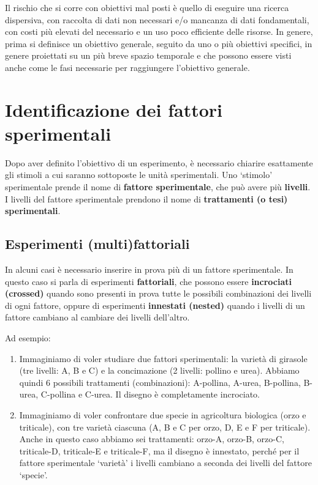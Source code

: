\documentclass[a4paper,12pt,oneside]{book}
\providecommand{\tightlist}{%
  \setlength{\itemsep}{0pt}\setlength{\parskip}{0pt}}
\begin{document}
Il rischio che si corre con obiettivi mal posti è quello di eseguire una ricerca dispersiva, con raccolta di dati non necessari e/o mancanza di dati fondamentali, con costi più elevati del necessario e un uso poco efficiente delle risorse. In genere, prima si definisce un obiettivo generale, seguito da uno o più obiettivi specifici, in genere proiettati su un più breve spazio temporale e che possono essere visti anche come le fasi necessarie per raggiungere l'obiettivo generale.

\hypertarget{identificazione-dei-fattori-sperimentali}{%
\section{Identificazione dei fattori sperimentali}\label{identificazione-dei-fattori-sperimentali}}

Dopo aver definito l'obiettivo di un esperimento, è necessario chiarire esattamente gli stimoli a cui saranno sottoposte le unità sperimentali. Uno `stimolo' sperimentale prende il nome di \textbf{fattore sperimentale}, che può avere più \textbf{livelli}. I livelli del fattore sperimentale prendono il nome di \textbf{trattamenti (o tesi) sperimentali}.

\hypertarget{esperimenti-multifattoriali}{%
\subsection{Esperimenti (multi)fattoriali}\label{esperimenti-multifattoriali}}

In alcuni casi è necessario inserire in prova più di un fattore sperimentale. In questo caso si parla di esperimenti \textbf{fattoriali}, che possono essere \textbf{incrociati (crossed)} quando sono presenti in prova tutte le possibili combinazioni dei livelli di ogni fattore, oppure di esperimenti \textbf{innestati (nested)} quando i livelli di un fattore cambiano al cambiare dei livelli dell'altro.

Ad esempio:

\begin{enumerate}
\def\labelenumi{\arabic{enumi}.}
\tightlist
\item
  Immaginiamo di voler studiare due fattori sperimentali: la varietà di girasole (tre livelli: A, B e C) e la concimazione (2 livelli: pollino e urea). Abbiamo quindi 6 possibili trattamenti (combinazioni): A-pollina, A-urea, B-pollina, B-urea, C-pollina e C-urea. Il disegno è completamente incrociato.
\item
  Immaginiamo di voler confrontare due specie in agricoltura biologica (orzo e triticale), con tre varietà ciascuna (A, B e C per orzo, D, E e F per triticale). Anche in questo caso abbiamo sei trattamenti: orzo-A, orzo-B, orzo-C, triticale-D, triticale-E e triticale-F, ma il disegno è innestato, perché per il fattore sperimentale `varietà' i livelli cambiano a seconda dei livelli del fattore `specie'.
\end{enumerate}
\end{document}
